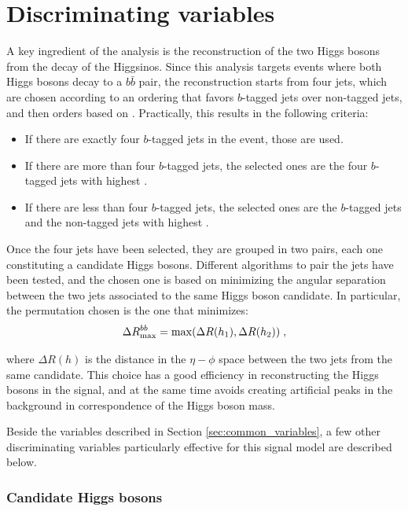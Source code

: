 \section{Discriminating variables}
\label{sec:ewk:sigbkg}

A key ingredient of the analysis is the reconstruction of the two Higgs bosons from the decay of the Higgsinos.
Since this analysis targets events where both Higgs bosons decay to a $b\bar{b}$ pair, the reconstruction starts 
from four jets, which are chosen according to an ordering that favors $b$-tagged jets over non-tagged jets,
and then orders based on \pt. Practically, this results in the following criteria:
\begin{itemize}
\item If there are exactly four $b$-tagged jets in the event, those are used.
\item If there are more than four $b$-tagged jets, the selected ones are the four $b$-tagged jets with highest \pt.
\item If there are less than four $b$-tagged jets, the selected ones are the $b$-tagged jets and the non-tagged jets with highest \pt.
\end{itemize} 

Once the four jets have been selected, they are grouped in two pairs, each one constituting a candidate Higgs bosons. 
Different algorithms to pair the jets have been tested, and the chosen one is based on minimizing the angular separation 
between the two jets associated to the same Higgs boson candidate. 
In particular, the permutation chosen is the one that minimizes:
\begin{equation}
\Delta R_{\mathrm{max}}^{bb} = \mathrm{max}(\Delta R(h_1), \Delta R(h_2)) \; ,
\end{equation}

\noindent where $\Delta R(h)$ is the distance in the $\eta-\phi$ space between the two jets from the same candidate.
This choice has a good efficiency in reconstructing the Higgs bosons in the signal, 
and at the same time avoids creating artificial peaks in the background in correspondence of the Higgs boson mass. 

Beside the variables described in Section \ref{sec:common_variables}, a few other discriminating variables particularly 
effective for this signal model are described below.

\subsubsection*{Candidate Higgs bosons}

